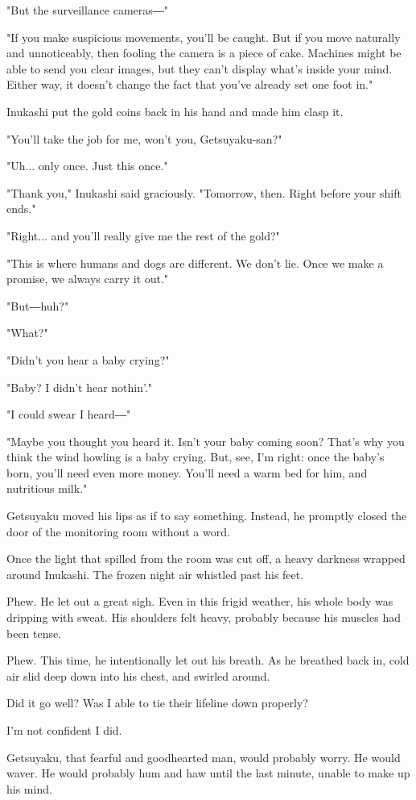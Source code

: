 "But the surveillance cameras―"

"If you make suspicious movements, you'll be caught. But if you move
naturally and unnoticeably, then fooling the camera is a piece of cake.
Machines might be able to send you clear images, but they can't display
what's inside your mind. Either way, it doesn't change the fact that
you've already set one foot in."

Inukashi put the gold coins back in his hand and made him clasp it.

"You'll take the job for me, won't you, Getsuyaku-san?"

"Uh... only once. Just this once."

"Thank you," Inukashi said graciously. "Tomorrow, then. Right before
your shift ends."

"Right... and you'll really give me the rest of the gold?"

"This is where humans and dogs are different. We don't lie. Once we make
a promise, we always carry it out."

"But―huh?"

"What?"

"Didn't you hear a baby crying?"

"Baby? I didn't hear nothin'."

"I could swear I heard―"

"Maybe you thought you heard it. Isn't your baby coming soon? That's why
you think the wind howling is a baby crying. But, see, I'm right: once
the baby's born, you'll need even more money. You'll need a warm bed for
him, and nutritious milk."

Getsuyaku moved his lips as if to say something. Instead, he promptly
closed the door of the monitoring room without a word.

Once the light that spilled from the room was cut off, a heavy darkness
wrapped around Inukashi. The frozen night air whistled past his feet.

Phew. He let out a great sigh. Even in this frigid weather, his whole
body was dripping with sweat. His shoulders felt heavy, probably because
his muscles had been tense.

Phew. This time, he intentionally let out his breath. As he breathed
back in, cold air slid deep down into his chest, and swirled around.

Did it go well? Was I able to tie their lifeline down properly?

I'm not confident I did.

Getsuyaku, that fearful and goodhearted man, would probably worry. He
would waver. He would probably hum and haw until the last minute, unable
to make up his mind.

